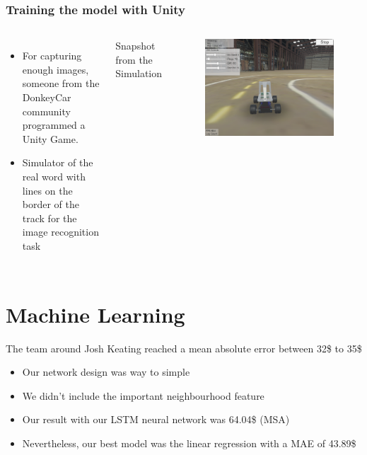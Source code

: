\documentclass{beamer}
\begin{document}
\begin{frame}
\frametitle{Training the model with Unity}
\begin{columns}[c] %

\begin{itemize}
\item For capturing enough images, someone from the DonkeyCar community programmed a Unity Game.
\item Simulator of the real word with lines on the border of the track for the image recognition task
\end{itemize}

Snapshot from the Simulation
\begin{figure}
\includegraphics[width=0.9\linewidth]{photo/unity}
\end{figure}
\end{columns}
\end{frame}

\section{Machine Learning}
\begin{frame}
The team around Josh Keating reached a mean absolute error between 32\$ to 35\$
\begin{itemize}
\item Our network design was way to simple
\item We didn't include the important neighbourhood feature
\item Our result with our LSTM neural network was 64.04\$ (MSA)
\item Nevertheless, our best model was the linear regression with a MAE of 43.89\$
\end{itemize}
\end{frame}
\end{document}

